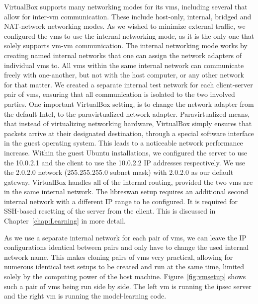 VirtualBox supports many networking modes for its \acp{vm}, including several that allow for inter-\ac{vm} communication. These include host-only, internal, bridged and NAT-network networking modes.
As we wished to minimize external traffic, we configured the \acp{vm} to use the internal networking mode, as it is the only one that solely supports \ac{vm}-\ac{vm} communication.
The internal networking mode works by creating named internal networks that one can assign the network adapters of individual \acp{vm} to. All \acp{vm} within the same internal network can communicate freely with one-another, but not with the host computer, or any other network for that matter. We created a separate internal test network for each client-server pair of \acp{vm}, ensuring that all communication is isolated to the two involved parties. One important VirtualBox setting, is to change the network adapter from the default Intel, to the paravirtualized network adapter. Paravirtualized means, that instead of virtualizing networking hardware, VirtualBox simply ensures that packets arrive at their designated destination, through a special software interface in the guest operating system. This leads to a noticeable network performance increase. Within the guest Ubuntu installations, we configured the server to use the 10.0.2.1 and the client to use the 10.0.2.2 IP addresses respectively. We use the 2.0.2.0 network (255.255.255.0 subnet mask) with 2.0.2.0 as our default gateway. VirtualBox handles all of the internal routing, provided the two \acp{vm} are in the same internal network. The libreswan setup requires an additional second internal network with a different IP range to be configured. It is required for SSH-based resetting of the server from the client. This is discussed in Chapter~\ref{chap:Learning} in more detail.

As we use a separate internal network for each pair of \acp{vm}, we can leave the IP configurations identical between pairs and only have to change the used internal network name. This makes cloning pairs of \acp{vm} very practical, allowing for numerous identical test setups to be created and run at the same time, limited solely by the computing power of the host machine. Figure~\ref{fig:vmsetup} shows such a pair of \acp{vm} being run side by side. The left \ac{vm} is running the \ac{ipsec} server and the right \ac{vm} is running the model-learning code.

